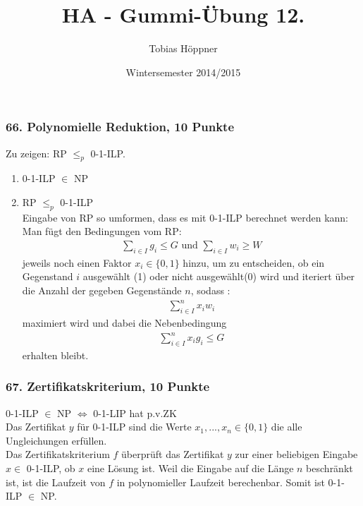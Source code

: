 \documentclass[ngerman,a4paper]{report}
\author{Tobias Höppner}
\title{HA - Gummi-Übung 12.}
\date{Wintersemester 2014/2015}
\renewcommand{\maketitle}{}
\begin{document}
 
\maketitle 

\subsubsection*{66. Polynomielle Reduktion, 10 Punkte}
Zu zeigen: RP $ \leq_p $ 0-1-ILP.
\begin{enumerate}
\item 0-1-ILP $\in$ NP
\item RP $ \leq_p $ 0-1-ILP\\
Eingabe von RP so umformen, dass es mit 0-1-ILP berechnet werden kann:\\
Man fügt den Bedingungen vom RP:
\begin{align*}
\sum_{i \in I} g_i \leq G \text{ und } \sum_{i \in I} w_i \geq W
\end{align*}
jeweils noch einen Faktor $x_i \in \{0,1\}$ hinzu, um zu entscheiden, ob ein Gegenstand $i$ ausgewählt (1) oder nicht ausgewählt(0) wird und iteriert über die Anzahl der gegeben Gegenstände $n$, sodass :
\begin{align*}
\sum_{i \in I}^n x_iw_i
\end{align*}
maximiert wird und dabei die Nebenbedingung
\begin{align*}
\sum_{i \in I}^n x_ig_i \leq G
\end{align*}
erhalten bleibt.
\end{enumerate} 

\subsubsection*{67. Zertifikatskriterium, 10 Punkte}

0-1-ILP $\in $ NP $\Leftrightarrow$ 0-1-LIP hat p.v.ZK\\

Das Zertifikat $y$ für 0-1-ILP sind die Werte $x_1,...,x_n \in \{0,1\}$ die alle Ungleichungen erfüllen.\\
Das Zertifikatskriterium $f$ überprüft das Zertifikat $y$ zur einer beliebigen Eingabe $x \in $ 0-1-ILP, ob $x$ eine Lösung ist. Weil die Eingabe auf die Länge $n$ beschränkt ist, ist die Laufzeit von $f$ in polynomieller Laufzeit berechenbar. Somit ist 0-1-ILP $\in$ NP.
\end{document}
